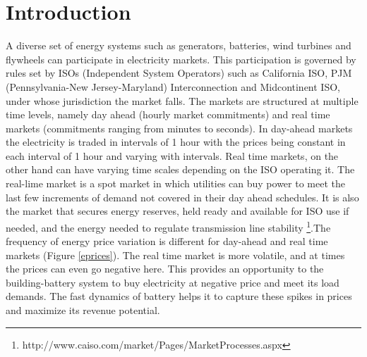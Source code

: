 \documentclass[11pt,twoside]{article}
\begin{document}
\section{Introduction}
A diverse set of energy systems such as generators, batteries, wind turbines and flywheels can participate in electricity markets. This participation is governed by rules set by ISOs (Independent System Operators) such as California ISO, PJM (Pennsylvania-New Jersey-Maryland) Interconnection and Midcontinent ISO, under whose jurisdiction the market falls. The markets are structured at multiple time levels, namely day ahead (hourly market commitments) and real time markets (commitments ranging from minutes to seconds). In day-ahead markets the electricity is traded in intervals of 1 hour with the prices being constant in each interval of 1 hour and varying with intervals. Real time markets, on the other hand can have varying time scales depending on the ISO operating it. The real-lime market is a spot market in which utilities can buy power to meet the last few increments of demand not covered in their day ahead schedules. It is also the market that secures energy reserves, held ready and available for ISO use if needed, and the energy needed to regulate transmission line stability \footnote{http://www.caiso.com/market/Pages/MarketProcesses.aspx}.The frequency of energy price variation is different for day-ahead and real time markets (Figure \ref{eprices}). The real time market is more volatile, and at times the prices can even go negative here. This provides an opportunity to the building-battery system to buy electricity at negative price and meet its load demands. The fast dynamics of battery helps it to capture these spikes in prices and maximize its revenue potential. 
\end{document}
